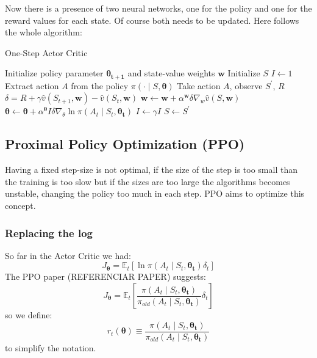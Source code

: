 Now there is a presence of two neural networks, one for the policy and one for the reward values for each state. Of course both needs to be updated. Here follows the whole algorithm:

\begin{algorithm}
	\caption{One-Step Actor Critic}\label{ActorCritic}
	\begin{algorithmic}[1]
		\State Initialize policy parameter $\bm{\theta_{t+1}}$ and state-value weights $\bm{w}$
		\State Initialize $S$
		\State $I \gets 1$
		\State Extract action $A$ from the policy $\pi\left(\cdot\mid S,\bm{\theta}\right)$
		\State Take action $A$, observe $S^\prime$, $R$
		\State $\delta = R + \gamma\hat{v}\left(S_{t+1},\bm{w}\right) - \hat{v}\left(S_t,\bm{w}\right)$
		\State $\bm{w} \gets \bm{w} + \alpha^{\bm{w}}\delta\nabla_{w}\hat{v}\left(S,\bm{w}\right)$
		\State $\bm{\theta} \gets \bm{\theta} + \alpha^{\bm{\theta}}I\delta\nabla_{\theta}\ln{\pi\left(A_t\mid S_t,\bm{\theta_t}\right)}$
		\State $I \gets \gamma I$
		\State $S \gets S^\prime$
		\EndWhile\label{time2}
		\EndWhile\label{forever2}
		\EndProcedure
	\end{algorithmic}
\end{algorithm}

\subsection{Proximal Policy Optimization (PPO)}

Having a fixed step-size is not optimal, if the size of the step is too small than the training is too slow but if the sizes are too large the algorithms becomes unstable, changing the policy too much in each step. PPO aims to optimize this concept.

\subsubsection{Replacing the log}
So far in the Actor Critic we had:
\begin{equation}
J_{\bm{\theta}} = \mathbb{E}_t\left[\ln{\pi\left(A_t\mid S_t,\bm{\theta_t}\right)}\delta_t\right]
\end{equation}
The PPO paper (REFERENCIAR PAPER) suggests:
\begin{equation}
J_{\bm{\theta}} = \mathbb{E}_t\left[\dfrac{\pi\left(A_t\mid S_t,\bm{\theta_t}\right)}{\pi_{old}\left(A_t\mid S_t,\bm{\theta_t}\right)}\delta_t\right]
\end{equation}
so we define:
\begin{equation}
r_t\left(\bm{\theta}\right) \equiv \dfrac{\pi\left(A_t\mid S_t,\bm{\theta_t}\right)}{\pi_{old}\left(A_t\mid S_t,\bm{\theta_t}\right)}
\end{equation}
to simplify the notation.

